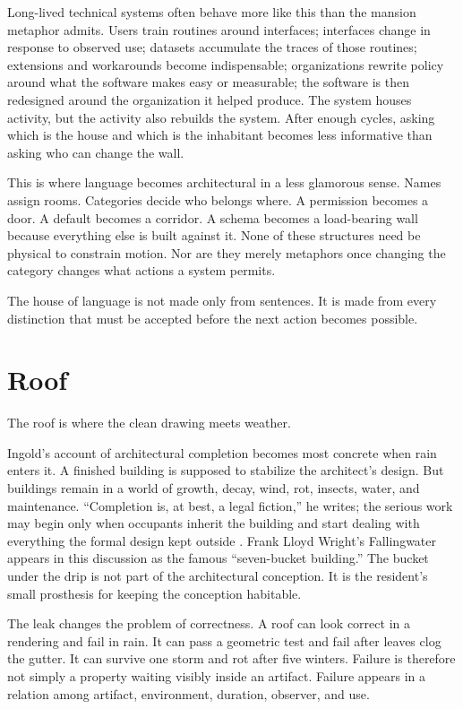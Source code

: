 \documentclass[11pt]{article}
\begin{document}
Long-lived technical systems often behave more like this than the mansion metaphor admits. Users train routines around interfaces; interfaces change in response to observed use; datasets accumulate the traces of those routines; extensions and workarounds become indispensable; organizations rewrite policy around what the software makes easy or measurable; the software is then redesigned around the organization it helped produce. The system houses activity, but the activity also rebuilds the system. After enough cycles, asking which is the house and which is the inhabitant becomes less informative than asking who can change the wall.

This is where language becomes architectural in a less glamorous sense. Names assign rooms. Categories decide who belongs where. A permission becomes a door. A default becomes a corridor. A schema becomes a load-bearing wall because everything else is built against it. None of these structures need be physical to constrain motion. Nor are they merely metaphors once changing the category changes what actions a system permits.

The house of language is not made only from sentences. It is made from every distinction that must be accepted before the next action becomes possible.

\section*{Roof}

The roof is where the clean drawing meets weather.

Ingold's account of architectural completion becomes most concrete when rain enters it. A finished building is supposed to stabilize the architect's design. But buildings remain in a world of growth, decay, wind, rot, insects, water, and maintenance. ``Completion is, at best, a legal fiction,'' he writes; the serious work may begin only when occupants inherit the building and start dealing with everything the formal design kept outside \cite{ingold2013}. Frank Lloyd Wright's Fallingwater appears in this discussion as the famous ``seven-bucket building.'' The bucket under the drip is not part of the architectural conception. It is the resident's small prosthesis for keeping the conception habitable.

The leak changes the problem of correctness. A roof can look correct in a rendering and fail in rain. It can pass a geometric test and fail after leaves clog the gutter. It can survive one storm and rot after five winters. Failure is therefore not simply a property waiting visibly inside an artifact. Failure appears in a relation among artifact, environment, duration, observer, and use.
\end{document}
